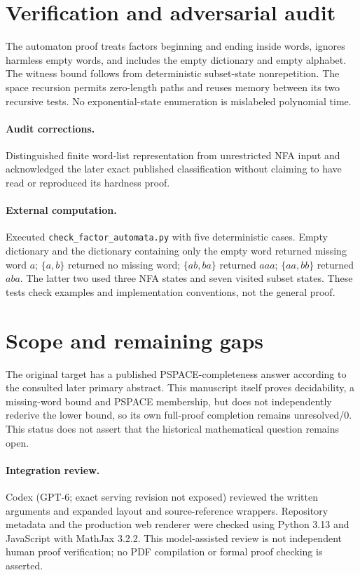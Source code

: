 \documentclass[11pt]{article}
\begin{document}
\section{Verification and adversarial audit}
The automaton proof treats factors beginning and ending inside words, ignores harmless empty words, and includes the empty dictionary and empty alphabet. The witness bound follows from deterministic subset-state nonrepetition. The space recursion permits zero-length paths and reuses memory between its two recursive tests. No exponential-state enumeration is mislabeled polynomial time.
\paragraph{Audit corrections.} Distinguished finite word-list representation from unrestricted NFA input and acknowledged the later exact published classification without claiming to have read or reproduced its hardness proof.
\paragraph{External computation.} Executed \texttt{check\_factor\_automata.py} with five deterministic cases. Empty dictionary and the dictionary containing only the empty word returned missing word $a$; $\{a,b\}$ returned no missing word; $\{ab,ba\}$ returned $aaa$; $\{aa,bb\}$ returned $aba$. The latter two used three NFA states and seven visited subset states. These tests check examples and implementation conventions, not the general proof.
\section{Scope and remaining gaps}
The original target has a published PSPACE-completeness answer according to the consulted later primary abstract. This manuscript itself proves decidability, a missing-word bound and PSPACE membership, but does not independently rederive the lower bound, so its own full-proof completion remains unresolved/0. This status does not assert that the historical mathematical question remains open.
\paragraph{Integration review.} Codex (GPT-6; exact serving revision not exposed) reviewed the written arguments and expanded layout and source-reference wrappers. Repository metadata and the production web renderer were checked using Python 3.13 and JavaScript with MathJax 3.2.2. This model-assisted review is not independent human proof verification; no PDF compilation or formal proof checking is asserted.
\end{document}
